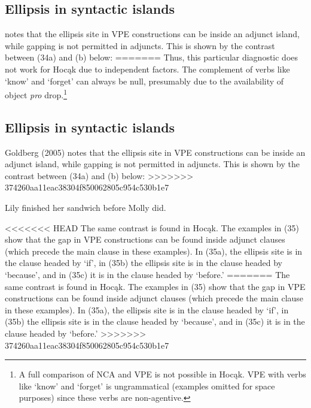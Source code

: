 \documentclass[output=paper]{LSP/langsci}
\begin{document}
\subsection{Ellipsis in syntactic islands}

\citet{Goldberg2005} notes that the ellipsis site in VPE constructions can be inside an adjunct island, while gapping is not permitted in adjuncts. This is shown by the contrast between (34a) and (b) below:
=======
Thus, this particular diagnostic does not work for Hoc\k{a}k due to independent factors. The complement of verbs like `know' and `forget' can always be null, presumably due to the availability of object \emph{pro} drop.\footnote{A full comparison of NCA and VPE is not possible in Hoc\k{a}k. VPE with verbs like `know' and `forget' is ungrammatical (examples omitted for space purposes) since these verbs are non-agentive.}

\subsection{Ellipsis in syntactic islands}

Goldberg (2005) notes that the ellipsis site in VPE constructions can be inside an adjunct island, while gapping is not permitted in adjuncts. This is shown by the contrast between (34a) and (b) below:
>>>>>>> 374260aa11eac38304f850062805c954c530b1e7

\begin{exe}
\ex
\begin{xlist}
\ex
Lily finished her sandwich before Molly did.
\end{xlist}
\end{exe}

<<<<<<< HEAD
The same contrast is found in Hocąk. The examples in (35) show that the gap in VPE constructions can be found inside adjunct clauses (which precede the main clause in these examples). In (35a), the ellipsis site is in the clause headed by `if', in (35b) the ellipsis site is in the clause headed by `because', and in (35c) it is in the clause headed by `before.'
=======
The same contrast is found in Hoc\k{a}k. The examples in (35) show that the gap in VPE constructions can be found inside adjunct clauses (which precede the main clause in these examples). In (35a), the ellipsis site is in the clause headed by `if', in (35b) the ellipsis site is in the clause headed by `because', and in (35c) it is in the clause headed by `before.'
>>>>>>> 374260aa11eac38304f850062805c954c530b1e7
\end{document}
